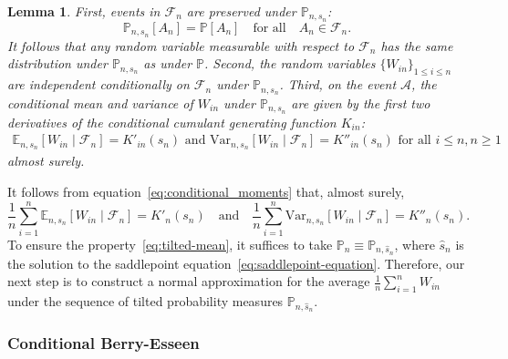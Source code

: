 \documentclass[12pt]{article}
\newtheorem{lemma}{Lemma}
\theoremstyle{definition}
\def\P{\mathbb{P}}
\def\P{\mathbb{P}}
\newcommand{\E}{\mathbb E}								%
\newcommand{\V}{\mathrm{Var}}							%
\renewcommand{\P}{\mathbb{P}}							%
\begin{document}
\begin{lemma} \label{lem:tilted_measure_properties}
	First, events in $\mathcal F_n$ are preserved under $\P_{n,s_n}$:
	\begin{equation}
	\P_{n,s_n}[A_n] = \P[A_n] \quad \text{for all} \quad A_n \in \mathcal F_n.
	\label{eq:preserving_measurable_events}
	\end{equation}
	It follows that any random variable measurable with respect to $\mathcal F_n$ has the same distribution under $\P_{n,s_n}$ as under $\P$. Second, the random variables $\{W_{in}\}_{1 \leq i \leq n}$ are independent conditionally on $\mathcal F_n$ under $\P_{n,s_n}$. Third, on the event $\mathcal A$, the conditional mean and variance of $W_{in}$ under $\P_{n,s_n}$ are given by the first two derivatives of the conditional cumulant generating function $K_{in}$:
	\begin{align}
	\E_{n, s_n}[W_{in} \mid \mathcal{F}_n]=K'_{in}(s_n) \text{ and } \V_{n, s_n}[W_{in} \mid \mathcal{F}_n]=K''_{in}(s_n) \text{ for all }i\leq n, n\geq 1
	\label{eq:conditional_moments}
	\end{align}
	almost surely.
\end{lemma} 

It follows from equation~\eqref{eq:conditional_moments} that, almost surely,
\begin{equation*}
	\frac{1}{n}\sum_{i = 1}^n \E_{n, s_n}[W_{in} \mid \mathcal F_n] = K'_n(s_n) \quad \text{and} \quad \frac{1}{n}\sum_{i = 1}^n \V_{n, s_n}[W_{in} \mid \mathcal F_n] = K''_n(s_n).
\end{equation*} 
To ensure the property~\eqref{eq:tilted-mean}, it suffices to take $\P_n \equiv \P_{n, \hat s_n}$, where $\hat s_n$ is the solution to the saddlepoint equation~\eqref{eq:saddlepoint-equation}. Therefore, our next step is to construct a normal approximation for the average $\frac1n \sum_{i = 1}^n W_{in}$ under the sequence of tilted probability measures $\P_{n, \hat s_n}$.

\subsubsection{Conditional Berry-Esseen}
\end{document}
